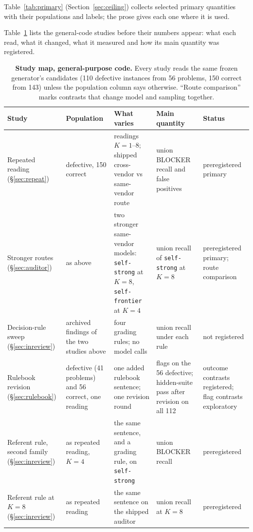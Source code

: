 Table~\ref{tab:primary} (Section~\ref{sec:ceiling}) collects selected primary quantities with their populations and labels;
the prose gives each one where it is used.

Table~\ref{tab:studymap} lists the general-code studies before their numbers appear: what each read,
what it changed, what it measured and how its main quantity was registered.

\begin{table}[t]
\centering\footnotesize
\caption{\textbf{Study map, general-purpose code.} Every study reads the same frozen generator's
candidates (110 defective instances from 56 problems, 150 correct from 143) unless the population
column says otherwise. ``Route comparison'' marks contrasts that change model and sampling
together.}
\label{tab:studymap}
\begin{tabular}{@{}>{\raggedright\arraybackslash}p{2.8cm}>{\raggedright\arraybackslash}p{3.1cm}>{\raggedright\arraybackslash}p{3.5cm}>{\raggedright\arraybackslash}p{3.0cm}>{\raggedright\arraybackslash}p{2.9cm}@{}}
\toprule
Study & Population & What varies & Main quantity & Status \\
\midrule
Repeated reading (\S\ref{sec:repeat}) & 110 defective, 150 correct & readings $K=1$--8; shipped cross-vendor vs same-vendor route & union BLOCKER recall and false positives & preregistered primary \\
Stronger routes (\S\ref{sec:auditor}) & as above & two stronger same-vendor models: \texttt{self-strong} at $K=8$, \texttt{self-frontier} at $K=4$ & union recall of \texttt{self-strong} at $K=8$ & preregistered primary; route comparison \\
Decision-rule sweep (\S\ref{sec:inreview}) & archived findings of the two studies above & four grading rules; no model calls & union recall under each rule & not registered \\
Rulebook revision (\S\ref{sec:rulebook}) & 56 defective (41 problems) and 56 correct, one reading & one added rulebook sentence; one revision round & flags on the 56 defective; hidden-suite pass after revision on all 112 & outcome contrasts registered; flag contrasts exploratory \\
Referent rule, second family (\S\ref{sec:inreview}) & as repeated reading, $K=4$ & the same sentence, and a grading rule, on \texttt{self-strong} & union BLOCKER recall & preregistered \\
Referent rule at $K=8$ (\S\ref{sec:inreview}) & as repeated reading & the same sentence on the shipped auditor & union recall at $K=8$ & preregistered \\

\end{tabular}
\end{table}
